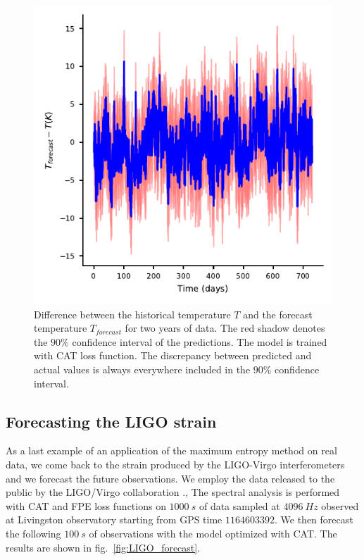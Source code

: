 \documentclass[twocolumn,showpacs,preprintnumbers,nofootinbib,prd,
superscriptaddress,10pt]{revtex4-1}
\begin{document}
\begin{figure}
	\caption{Difference between the historical temperature $T$ and the forecast temperature $T_{forecast}$ for two years of data. The red shadow denotes the $90\%$ confidence interval of the predictions. The model is trained with CAT loss function. The discrepancy between predicted and actual values is always everywhere included in the $90\%$ confidence interval.}
	\label{fig:temp_forecast}
	\includegraphics{Images/climate_plots/forecast_accuracy.pdf}
\end{figure}

\subsection{Forecasting the LIGO strain} \label{sec:LIGO_forecasting}
As a last example of an application of the maximum entropy method on real data, we come back to the strain produced by the LIGO-Virgo interferometers and we forecast the future observations.
We employ the data released to the public by the LIGO/Virgo collaboration \cite{Abbott_2021}.,
The spectral analysis is performed with CAT and FPE loss functions on $\SI{1000}{s}$ of data \cite{Abbott_2021} sampled at $\SI{4096}{Hz}$ observed at Livingston observatory starting from GPS time $1164603392$.
We then forecast the following $\SI{100}{s}$ of observations with the model optimized with CAT. The results are shown in fig.~\ref{fig:LIGO_forecast}.
\end{document}
